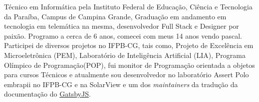 \begin{cvletter}
  Técnico em Informática pela Instituto Federal de Educação, Ciência e Tecnologia da Paraíba, Campus de Campina Grande, Graduação em andamento em tecnologia em telemática na mesma, desenvolvedor Full Stack e Designer por paixão. Programo a cerca de 6 anos, comecei com meus 14 anos vendo pascal. Participei de diversos projetos no IFPB-CG, tais como, Projeto de Excelência em Microeletrônica (PEM), Laboratório de Inteligência Artificial (LIA), Programa Olímpico de Programação(POP), fui monitor de Programação orientada a objetos para cursos Técnicos e atualmente sou desenvolvedor no laboratório Assert Polo embrapii no IFPB-CG e na SolarView e um dos \textit{maintainers} da tradução da documentação do \href{https://www.gatsbyjs.org/}{GatsbyJS}.

\end{cvletter}